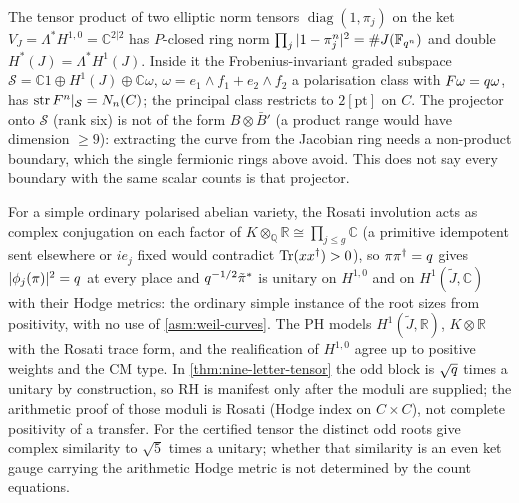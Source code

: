 \begin{proposition}
\label{prop:jacobian-curve-projector}
The tensor product of two elliptic norm tensors $\operatorname{diag}(1,\pi_j)$ on the ket
$V_J = \Lambda^*H^{1,0} = \mathbb C^{2|2}$ has $P$-closed ring norm $\prod_j|1-\pi_j^n|^2 = \#J(\mathbb F_{q^{n}})$ %
and double $H^*(J) = \Lambda^*H^1(J)$. Inside it the Frobenius-invariant graded subspace %
$\mathcal S = \mathbb C1\oplus H^1(J)\oplus\mathbb C\omega$, $\omega = e_1\wedge f_1+e_2\wedge f_2$ a
polarisation class with $F\omega = q\omega$, has $\operatorname{str} F^n|_{\mathcal S} = N_{n}(C)$; the
principal class restricts to $2[\mathrm{pt}]$ on $C$. The projector onto $\mathcal S$ (rank six) is
not of the form $B\otimes\bar B'$ (a product range would have dimension $\ge9$): extracting the
curve from the Jacobian ring needs a non-product boundary, which the single fermionic rings
above avoid. This does not say every boundary with the same scalar counts is that projector.
\end{proposition}

\begin{theorem}
\label{thm:rosati-ph-genus-two}
For a simple ordinary polarised abelian variety, the Rosati involution acts as complex
conjugation on each factor of $K\otimes_{\mathbb Q}\mathbb R\cong\prod_{j\le g}\mathbb C$ (a primitive
idempotent sent elsewhere or $ie_j$ fixed would contradict $\operatorname{Tr}(xx^\dagger)>0$), so
$\pi\pi^\dagger = q$ gives $|\phi_j(\pi)|^2 = q$ at every place and $q^{-1/2}\tilde\pi^*$ is
unitary on $H^{1,0}$ and on $H^1(\tilde J,\mathbb C)$ with their Hodge metrics: the ordinary simple
instance of the root sizes from positivity, with no use of \cref{asm:weil-curves}. The PH
models $H^1(\tilde J,\mathbb R)$, $K\otimes\mathbb R$ with the Rosati trace form, and the realification
of $H^{1,0}$ agree up to positive weights and the CM type. In \cref{thm:nine-letter-tensor} the
odd block is $\sqrt{q}$ times a unitary by construction, so RH is manifest only after the
moduli are supplied; the arithmetic proof of those moduli is Rosati (Hodge index on $C\times C$),
not complete positivity of a transfer. For the certified tensor the distinct odd roots give
complex similarity to $\sqrt5$ times a unitary; whether that similarity is an even ket gauge
carrying the arithmetic Hodge metric is not determined by the count equations.
\end{theorem}

